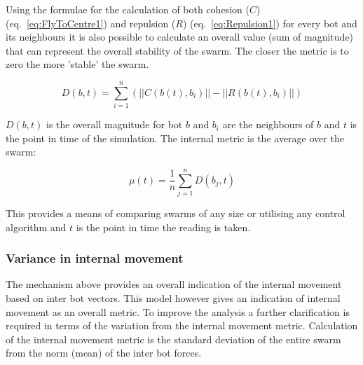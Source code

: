 \documentclass[10pt,journal,letterpaper,twoside]{IEEEtran}
\newcommand{\stability}{internal movement}
\newcommand{\Eq}{eq.}
\begin{document}
Using the formulae for the calculation of both cohesion ($C$) (\Eq{}~\ref{eq:FlyToCentre1}) and repulsion ($R$) (\Eq{}~\ref{eq:Repulsion1}) for every bot and its neighbours it is also possible to calculate an overall value (sum of magnitude) that can represent the overall stability of the swarm. The closer the metric is to zero the more 'stable' the swarm.


\begin{equation}
\label{eq:BotStabilityT}
D(b,t) = \sum_{i=1}^{n}(||C(b(t),b_{i})|| - ||R(b(t),b_{i})||)
\end{equation}

$D(b,t)$ is the overall magnitude for bot $b$ and $b_i$ are the neighbours of $b$ and $t$ is the point in time of the simulation. The internal metric is the average over the swarm:




\begin{equation}
\label{eq:SwarmStabilityMetricT}
\mu(t) = \frac{1}{n}{\sum_{j=1}^{n}D(b_j,t)}
\end{equation}

This provides a means of comparing swarms of any size or utilising any control algorithm and $t$ is the point in time the reading is taken.

\subsubsection{Variance in \stability{}}\label{Section:VarienceInStability}

The mechanism above provides an overall indication of the \stability{} based on inter bot vectors. This model however gives an indication of \stability{} as an overall metric. To improve the analysis a further clarification is required in terms of the variation from the \stability{} metric. Calculation of the \stability{} metric is the standard deviation of the entire swarm from the norm (mean) of the inter bot forces.
\end{document}
